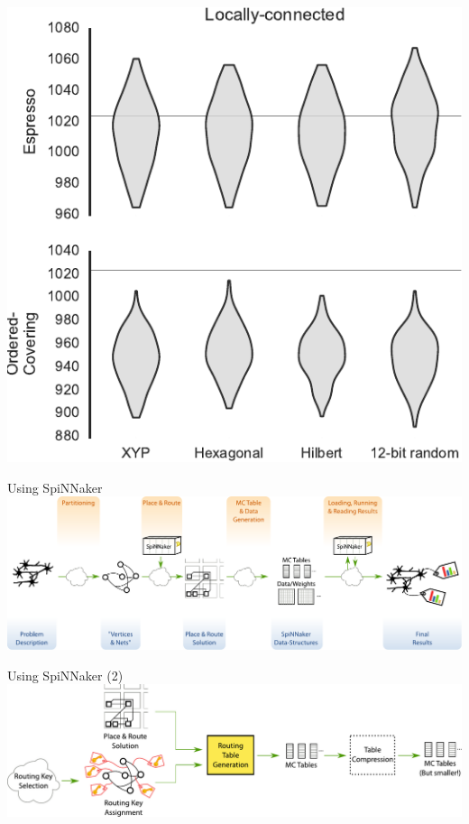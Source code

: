 \documentclass[t]{beamer}
\begin{document}
\begin{frame}[plain]{}
  \includegraphics{keyspaces}
\end{frame}

\begin{frame}[c]{Using SpiNNaker}
  \includegraphics[width=\textwidth]{typical_application}
\end{frame}

\begin{frame}[c]{Using SpiNNaker (2)}
  \includegraphics[width=\textwidth]{table_and_data_gen}
\end{frame}
\end{document}
